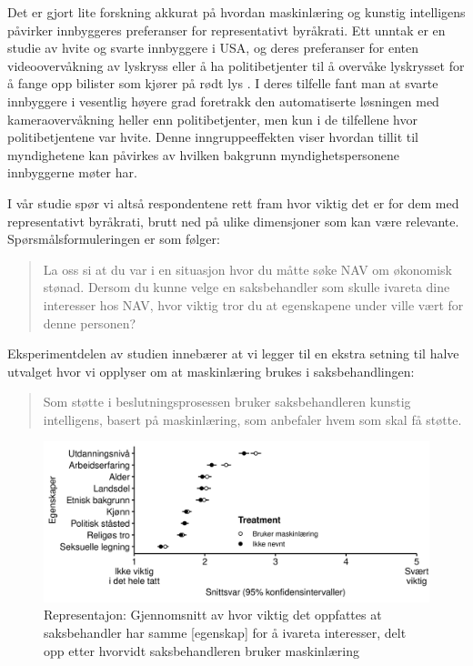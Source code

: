 \documentclass[
  12pt,
  a4paper, 12pt]{article}
\begin{document}
Det er gjort lite forskning akkurat på hvordan maskinlæring og kunstig intelligens påvirker innbyggeres preferanser for representativt byråkrati.
Ett unntak er en studie av hvite og svarte innbyggere i USA, og deres preferanser for enten videoovervåkning av lyskryss eller å ha politibetjenter til å overvåke lyskrysset for å fange opp bilister som kjører på rødt lys \citep{miller2021representative}.
I deres tilfelle fant man at svarte innbyggere i vesentlig høyere grad foretrakk den automatiserte løsningen med kameraovervåkning heller enn politibetjenter, men kun i de tilfellene hvor politibetjentene var hvite.
Denne inngruppeeffekten viser hvordan tillit til myndighetene kan påvirkes av hvilken bakgrunn myndighetspersonene innbyggerne møter har.

I vår studie spør vi altså respondentene rett fram hvor viktig det er for dem med representativt byråkrati, brutt ned på ulike dimensjoner som kan være relevante.
Spørsmålsformuleringen er som følger:

\begin{quote}
La oss si at du var i en situasjon hvor du måtte søke NAV om økonomisk stønad. Dersom du kunne velge en saksbehandler som skulle ivareta dine interesser hos NAV, hvor viktig tror du at egenskapene under ville vært for denne personen?
\end{quote}

Eksperimentdelen av studien innebærer at vi legger til en ekstra setning til halve utvalget hvor vi opplyser om at maskinlæring brukes i saksbehandlingen:

\begin{quote}
Som støtte i beslutningsprosessen bruker saksbehandleren kunstig intelligens, basert på maskinlæring, som anbefaler hvem som skal få støtte.
\end{quote}

\begin{figure}

{\centering \includegraphics[width=0.9\linewidth]{figs/png/fig_exp_repr_each} 

}

\caption{Representajon: Gjennomsnitt av hvor viktig det oppfattes at saksbehandler har samme [egenskap] for å ivareta interesser, delt opp etter hvorvidt saksbehandleren bruker maskinlæring}\label{fig:unnamed-chunk-33}
\end{figure}
\end{document}
